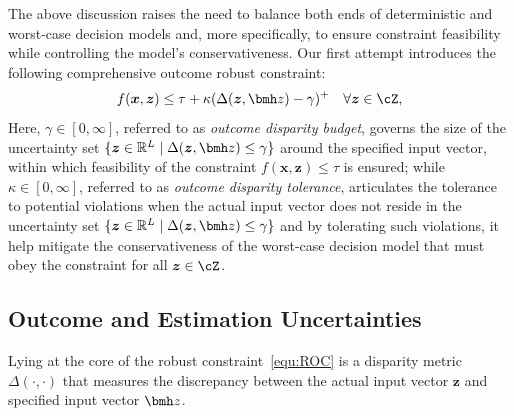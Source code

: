 \documentclass[opre, blindrev]{informs4}
\newcommand{\1}[1]{\mathds{1}{\left(#1\right)}}
\begin{document}
The above discussion raises the need to balance both ends of deterministic and worst-case decision models and, more specifically, to ensure constraint feasibility while controlling the model's conservativeness. Our first attempt introduces the following comprehensive outcome robust constraint:
\begin{equation}
\label{equ:ROC}
f(\bm x,\bm z) \leq \tau + \kappa (\Delta(\bm z,\bmh z) - \gamma)^+ ~~~\forall \bm z \in \cZ,
\end{equation}
Here, $\gamma \in [0,\infty]$, referred to as \textit{outcome disparity budget}, governs the size of the uncertainty set $\{\bm z \in \mathbb{R}^L \;|\; \Delta(\bm z, \bmh z) \leq \gamma\}$ around the specified input vector, within which feasibility of the constraint $f(\bm x, \bm z) \leq \tau$ is ensured; while $\kappa \in [0, \infty]$, referred to as \textit{outcome disparity tolerance}, articulates the tolerance to potential violations when the actual input vector does not reside in the uncertainty set $\{\bm z \in \mathbb{R}^L \;|\; \Delta(\bm z, \bmh z) \leq \gamma\}$ and by tolerating such violations, it help mitigate the conservativeness of the worst-case decision model that must obey the constraint for all $\bm z \in \cZ$. 

\subsection*{Outcome and Estimation Uncertainties}

Lying at the core of the robust constraint~\eqref{equ:ROC} is a disparity metric $\Delta(\cdot,\cdot)$ that measures the discrepancy between the actual input vector $\bm z$ and specified input vector $\bmh z$. 
\end{document}
